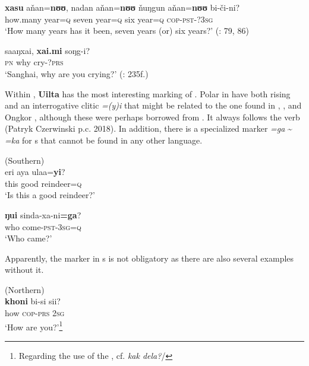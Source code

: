     \ex
    \gll \textbf{{xasu}} aňan=\textbf{{nʊʊ}},  nadan  aňan=\textbf{{nʊʊ}} ňuŋgun    aňan=\textbf{{nʊʊ}} bi-či-ni?\\
    how.many  year=\textsc{q} seven  year=\textsc{q} six    year=\textsc{q}    \textsc{cop}-\textsc{pst}-?3\textsc{sg}\\
    \glt ‘How many years has it been, seven years (or) six years?’ (\citealt{Kazama2002b}: 79, 86)
    
    \ex
    \gll saaŋxai, \textbf{{xai.mi}} soŋg-i?\\
    \textsc{pn}    why    cry-?\textsc{prs}\\
    \glt ‘Sanghai, why are you crying?’ (\citealt{Schmidt1923b}: 235f.)\z\z

Within , \textbf{Uilta} has the most interesting marking of . Polar  in  have both rising  and an interrogative clitic \textit{=(y)i} that might be related to the one found in , , and Ongkor , although these were perhaps borrowed from . It always follows the verb (Patryk Czerwinski p.c. 2018). In addition, there is a specialized marker \textit{=ga} {\textasciitilde} \textit{=ka} for s that cannot be found in any other  language.

\ea%
    \label{ex:tungu:55}
     (Southern)\\
    \ea
    \gll eri aya ulaa=\textbf{{yi}}?\\
    this  good  reindeer=\textsc{q}\\
    \glt ‘Is this a good reindeer?’
    
    \ex
    \gll \textbf{{ŋui}}  sinda-xa-ni\textbf{{=ga}}?\\
    who  come-\textsc{pst}-3\textsc{sg}=\textsc{q}\\
    \glt ‘Who came?’ \citep[15]{Tsumagari2009b}
    \z
    \z

Apparently, the marker in s is not obligatory as there are also several examples without it.

\ea%
    \label{ex:tungu:56}
     (Northern)\\
    \gll \textbf{{khoni}} bi-si    sii?\\
    how  \textsc{cop}-\textsc{prs}  2\textsc{sg}\\
    \glt ‘How are you?’\footnote{Regarding the use of the , cf.  \textit{kak dela?}/} \citep[150]{Funk2000}
    \z

